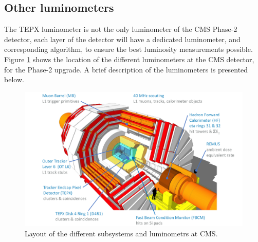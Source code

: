 \subsection{Other luminometers}

The TEPX luminometer is not the only luminometer of the CMS Phase-2 detector, each layer of the detector will have a dedicated luminometer, and corresponding algorithm, to ensure the best luminosity measurements possible.
Figure \ref{cmslum} shows the location of the different luminometers at the CMS detector, for the Phase-2 upgrade. A brief description of the luminometers is presented below.
\begin{center}
\begin{figure}[H]
    \centering
    \includegraphics[scale=0.3]{Chapter3/cmdlum.png}
    \caption[Different subsystems and luminometrs at CMS.]{Layout of the different subsystems and luminometrs at CMS. }
    \label{cmslum}
\end{figure}
\end{center}
